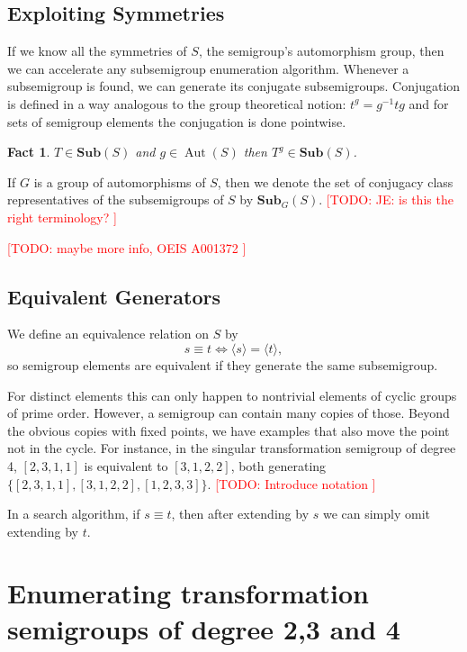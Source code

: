 \documentclass{amsart}
\newcommand{\Sub}{\mathbf{Sub}}
\DeclareMathOperator{\Aut}{Aut}
\newcommand{\todo}[1]{\textcolor{red}{ \small \textsf{[TODO:  #1 ]} \normalsize}}
\theoremstyle{plain}
\newtheorem{fact}[theorem]{Fact}
\theoremstyle{definition}
\begin{document}
\subsection{Exploiting Symmetries}
If we know all the symmetries of $S$, the semigroup's automorphism group, then we can accelerate any subsemigroup enumeration algorithm.
Whenever a subsemigroup is found, we can generate its conjugate subsemigroups.
Conjugation is defined in a way analogous to the group theoretical notion: $t^g=g^{-1}tg$ and for sets of semigroup elements the conjugation is done pointwise.
 
\begin{fact}
$T\in\Sub(S)$ and $g\in \Aut(S)$ then $T^g\in\Sub(S)$.%
\end{fact}

If $G$ is a group of automorphisms of $S$, then we denote the set of conjugacy class representatives of the subsemigroups of $S$ by $\Sub_G(S)$. \todo{JE: is this the right terminology?}

\todo{maybe more info, OEIS A001372}


\subsection{Equivalent Generators}
\label{sec:equivgen}
We define an equivalence relation on $S$ by
$$ s\equiv t \Longleftrightarrow \langle s \rangle= \langle t  \rangle,$$
so semigroup elements are equivalent if they generate the same subsemigroup.

For distinct elements this can only happen to nontrivial elements of cyclic groups of prime order.
However, a semigroup can contain many copies of those.
Beyond the obvious copies with fixed points, we have examples that also move the point not in the cycle. For instance, in the singular transformation semigroup of degree 4, $[ 2, 3, 1, 1 ]$ is equivalent to  $[ 3, 1, 2, 2 ]$, both generating $\{ [ 2, 3, 1, 1 ], [ 3, 1, 2, 2 ], [ 1, 2, 3, 3 ]\}$.\todo{Introduce notation}

In a search algorithm, if $s\equiv t$, then after extending by $s$ we can simply omit extending by $t$.

\section{Enumerating transformation semigroups of degree 2,3 and 4}
\label{sec:fulltranssgp}
\end{document}
